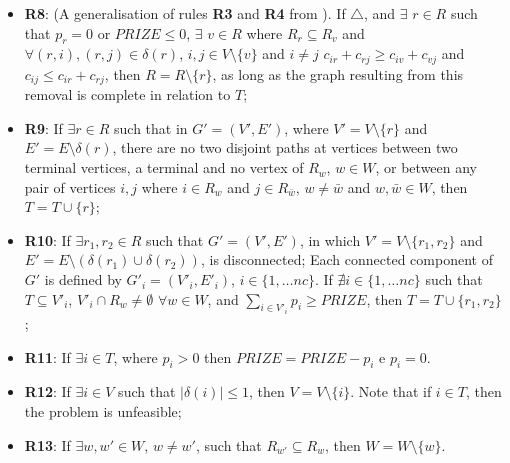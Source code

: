 \documentclass{singlecol-new}
\theoremstyle{TH}{
\newtheorem{lemma}{Lemma}
\newtheorem{theorem}[lemma]{Theorem}
\newtheorem{corrolary}[lemma]{Corrolary}
\newtheorem{conjecture}[lemma]{Conjecture}
\newtheorem{proposition}[lemma]{Proposition}
\newtheorem{claim}[lemma]{Claim}
\newtheorem{stheorem}[lemma]{Wrong Theorem}
}
\theoremstyle{THrm}{
\newtheorem{definition}{Definition}[section]
\newtheorem{question}{Question}[section]
\newtheorem{remark}{Remark}
\newtheorem{scheme}{Scheme}
}
\theoremstyle{THhit}{
\newtheorem{case}{Case}[section]
}
\begin{document}
\begin{itemize}


\item  \textbf{R8}: (A generalisation of rules \textbf{R3} and \textbf{R4} from \citet{lyra2004problema}). If $\triangle$, and $\exists$ $r \in R$ such that $p_r = 0$ or $PRIZE \leq 0$, $\exists$ $v \in R$ where $R_r \subseteq R_v$ and $\forall (r,i), (r,j) \in \delta(r)$,  $i,j \in V \setminus \{ v \}$ and $i \neq j$ $c_{ir} + c_{rj} \geq c_{iv} + c_{vj}$ and $c_{ij} \leq c_{ir} + c_{rj}$, then $R = R \setminus \{ r \}$, as long as  the graph resulting from this removal is complete in relation to $T$;



\item  \textbf{R9}: If $\exists r \in R$ such that in $G' = (V', E')$, where $V' = V \setminus \{ r \}$ and $E' = E \setminus \delta(r)$, there are no two disjoint paths at vertices between two terminal vertices, a terminal and no vertex of $ R_w $, $ w \in W $, or between any pair of vertices $ i, j $ where $ i \in R_w $ and $ j \in R _ {\bar{w}} $, $ w \neq \bar{w} $ and $ w, \bar{w} \in W $, then $ T = T \cup \{r \} $;

\item \textbf{R10}: If $ \exists r_1, r_2 \in R $ such that $ G'= (V', E ')$, in which $ V' = V \setminus \{r_1, r_2 \} $ and $ E'= E \setminus (\delta(r_1) \cup \delta (r_2))$, is disconnected; Each connected component of $ G'$ is defined by $ G'_i = (V'_i, E'_i) $, $ i \in \{1, \ldots nc \} $. If $ \nexists i \in \{1, \ldots nc \} $ such that $ T \subseteq V'_i $, $ V'_i \cap R_w \neq \emptyset $ $ \forall w \in W $, and $ \sum_ {i \in V'_i} p_i \geq PRIZE $, then $ T = T \cup \{r_1, r_2 \} $;


\item \textbf{R11}: If $\exists i \in T$, where $p_i > 0$ then $PRIZE = PRIZE - p_i$ e $p_i = 0$.


\item \textbf{R12}: If $\exists i \in V$ such that $|\delta(i)| \leq 1$, then $V = V \setminus \{ i \}$. Note that if $i \in T$, then the problem is unfeasible;

\item \textbf{R13}: If $\exists w, w' \in W$, $w \neq w'$, such that $R_{w'} \subseteq R_w$, then $W = W \setminus \{ w \}$.
\end{itemize}
\end{document}
